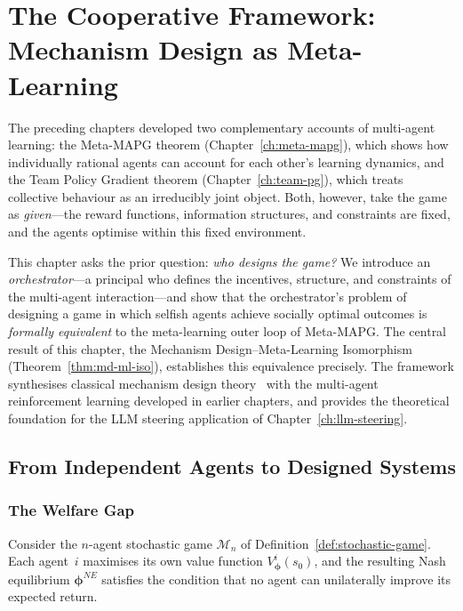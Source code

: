 
\chapter{The Cooperative Framework: Mechanism Design as Meta-Learning}
\label{ch:cooperative}

The preceding chapters developed two complementary accounts of multi-agent learning: the Meta-MAPG theorem (Chapter~\ref{ch:meta-mapg}), which shows how individually rational agents can account for each other's learning dynamics, and the Team Policy Gradient theorem (Chapter~\ref{ch:team-pg}), which treats collective behaviour as an irreducibly joint object. Both, however, take the game as \emph{given}---the reward functions, information structures, and constraints are fixed, and the agents optimise within this fixed environment.

This chapter asks the prior question: \emph{who designs the game?} We introduce an \emph{orchestrator}---a principal who defines the incentives, structure, and constraints of the multi-agent interaction---and show that the orchestrator's problem of designing a game in which selfish agents achieve socially optimal outcomes is \emph{formally equivalent} to the meta-learning outer loop of Meta-MAPG. The central result of this chapter, the Mechanism Design--Meta-Learning Isomorphism (Theorem~\ref{thm:md-ml-iso}), establishes this equivalence precisely. The framework synthesises classical mechanism design theory~\cite{hurwicz1972,myerson1981,maskin1999} with the multi-agent reinforcement learning developed in earlier chapters, and provides the theoretical foundation for the LLM steering application of Chapter~\ref{ch:llm-steering}.

\section{From Independent Agents to Designed Systems}
\label{sec:independent-to-designed}

\subsection{The Welfare Gap}
\label{subsec:welfare-gap}

Consider the $n$-agent stochastic game $\mathcal{M}_n$ of Definition~\ref{def:stochastic-game}. Each agent~$i$ maximises its own value function $V^i_{\bm{\phi}}(s_0)$, and the resulting Nash equilibrium $\bm{\phi}^{NE}$ satisfies the condition that no agent can unilaterally improve its expected return.


